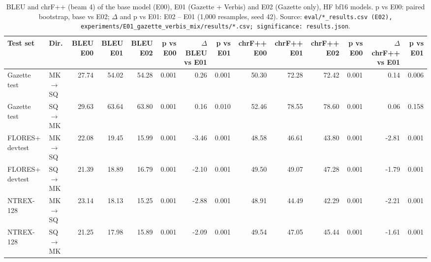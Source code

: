 \begin{table}[t]
\centering
\small
\begin{tabular}{llrrrrrrrrrrrr}
\toprule
Test set & Dir. & BLEU E00 & BLEU E01 & BLEU E02 & p vs E00 & $\Delta$BLEU vs E01 & p vs E01 & chrF++ E00 & chrF++ E01 & chrF++ E02 & p vs E00 & $\Delta$chrF++ vs E01 & p vs E01 \\
\midrule
Gazette test & MK$\rightarrow$SQ & 27.74 & 54.02 & 54.28 & 0.001 & 0.26 & 0.001 & 50.30 & 72.28 & 72.42 & 0.001 & 0.14 & 0.006 \\
Gazette test & SQ$\rightarrow$MK & 29.63 & 63.64 & 63.80 & 0.001 & 0.16 & 0.010 & 52.46 & 78.55 & 78.60 & 0.001 & 0.06 & 0.158 \\
FLORES+ devtest & MK$\rightarrow$SQ & 22.08 & 19.45 & 15.99 & 0.001 & -3.46 & 0.001 & 48.58 & 46.61 & 43.80 & 0.001 & -2.81 & 0.001 \\
FLORES+ devtest & SQ$\rightarrow$MK & 21.39 & 18.89 & 16.79 & 0.001 & -2.10 & 0.001 & 49.50 & 49.07 & 47.28 & 0.001 & -1.79 & 0.001 \\
NTREX-128 & MK$\rightarrow$SQ & 23.14 & 18.13 & 15.25 & 0.001 & -2.88 & 0.001 & 48.91 & 44.49 & 42.29 & 0.001 & -2.21 & 0.001 \\
NTREX-128 & SQ$\rightarrow$MK & 21.25 & 17.98 & 15.89 & 0.001 & -2.09 & 0.001 & 49.54 & 47.05 & 45.44 & 0.001 & -1.61 & 0.001 \\
\bottomrule
\end{tabular}
\caption{BLEU and chrF++ (beam 4) of the base model (E00), E01 (Gazette + Verbis) and E02 (Gazette only), HF bf16 models. p vs E00: paired bootstrap, base vs E02; $\Delta$ and p vs E01: E02 -- E01 (1,000 resamples, seed 42). Source: \texttt{eval/*\_results.csv (E02), experiments/E01\_gazette\_verbis\_mix/results/*.csv; significance: results.json}.}
\label{tab:e02-main-results}
\end{table}
